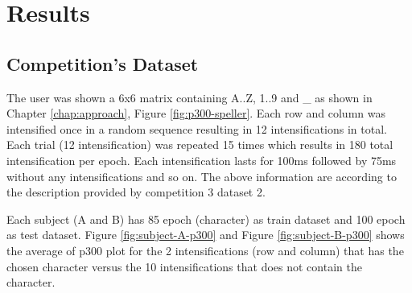 \chapter{Results}
\label{chap:results}
\section{Competition's Dataset}
\label{section:competitions-dataset}
The user was shown a 6x6 matrix containing A..Z, 1..9 and \_ as shown in Chapter \ref{chap:approach}, Figure \ref{fig:p300-speller}. Each row and column was intensified once in a random sequence resulting in 12 intensifications in total. Each trial (12 intensification) was repeated 15 times which results in 180 total intensification per epoch. Each intensification lasts for 100ms followed by 75ms without any intensifications and so on. The above information are according to the description provided by competition 3 dataset 2.\par
Each subject (A and B) has 85 epoch (character) as train dataset and 100 epoch as test dataset. Figure \ref{fig:subject-A-p300} and Figure \ref{fig:subject-B-p300} shows the average of \ac{p300} plot for the 2 intensifications (row and column) that has the chosen character versus the 10 intensifications that does not contain the character.\par
